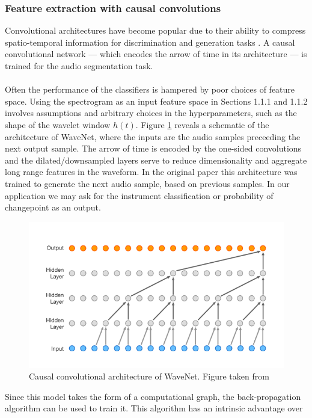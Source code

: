 \documentclass{article}[12pt]
\numberwithin{equation}{section}
\begin{document}
\subsubsection{Feature extraction with causal convolutions}
Convolutional architectures have become popular due to their ability to compress spatio-temporal
information for discrimination and generation tasks \cite{Oord2016a,Goodfellow}.
A causal convolutional network \cite{WaveNet} --- which encodes the arrow of time in
its architecture --- is trained for the audio segmentation task.
\\\\
Often the performance of the classifiers is hampered by poor choices of feature
space. Using the spectrogram as an input feature space in Sections 1.1.1 and
1.1.2 involves assumptions and arbitrary choices in the hyperparameters, such as
the shape of the wavelet window $h(t)$. Figure \ref{fig:wavenet} reveals a
schematic of the architecture of WaveNet, where the inputs are the audio samples
preceeding the next output sample. The arrow of time is encoded by the one-sided
convolutions and the dilated/downsampled layers serve to reduce dimensionality
and aggregate long range features in the waveform. In the original paper this
architecture was trained to generate the next audio sample, based on previous
samples. In our application we may ask for the instrument classification or
probability of changepoint as an output.
\begin{figure}[H]
\centering{}
\captionsetup{justification=centering}
\includegraphics[scale=0.5]{wavenet}
\caption{
Causal convolutional architecture of WaveNet. Figure taken from \cite{WaveNet}
}
\label{fig:wavenet}
\end{figure}\noindent
Since this model takes the form of a computational graph, the back-propagation
algorithm can be used to train it. This algorithm has an intrinsic advantage over
\end{document}
